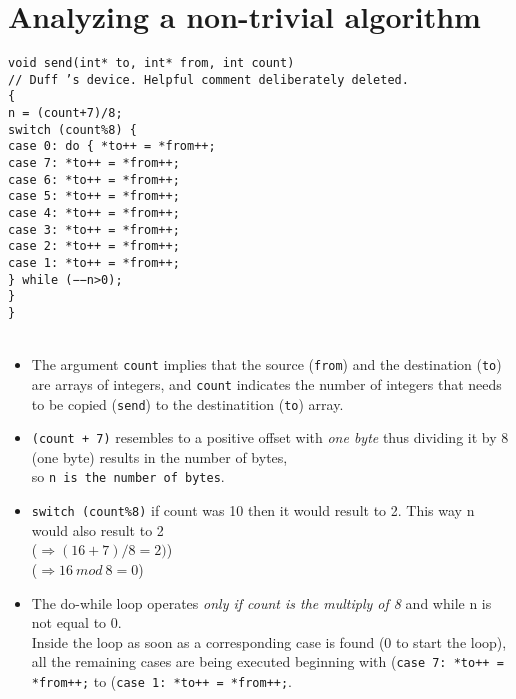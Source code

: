 \documentclass{article}
\begin{document}
 \section*{Analyzing a non-trivial algorithm}
 \texttt{void send(int* to, int* from, int count)\\
    // Duff ’s device. Helpful comment deliberately deleted.\\
    \{\\
      n = (count+7)/8;\\
      switch (count\%8) \{\\
      case 0: do \{ *to++ = *from++;\\
      case 7: *to++ = *from++;\\
      case 6: *to++ = *from++;\\
      case 5: *to++ = *from++;\\
      case 4: *to++ = *from++;\\
      case 3: *to++ = *from++;\\
      case 2: *to++ = *from++;\\
      case 1: *to++ = *from++;\\
        \} while (−−n>0);\\
      \}\\
    \}}
    \\
    \\
    \begin{itemize}
     \item The argument \texttt{count} implies that the source (\texttt{from}) and the destination (\texttt{to}) are arrays of integers,
     and \texttt{count} indicates the number of integers that needs to be copied (\texttt{send}) to the destinatition (\texttt{to}) array.
     \item \texttt{(count + 7)} resembles to a positive offset with \textsl{one byte} thus dividing it by $8$ (one byte) results in the number of bytes, \\
     so \texttt{n is the number of bytes}.
     \item \texttt{switch (count\%8)} if count was 10 then it would result to 2. This way n would also result to 2 \\
     ($\Rightarrow (16 + 7) / 8 = 2)$)\\
     ($\Rightarrow 16\ mod\ 8 = 0$)
     \item The do-while loop operates \textsl{only if count is the multiply of 8} and while n is not equal to 0. \\
     Inside the loop as soon as a corresponding case is found ($0$ to start the loop), all the remaining cases are being executed
     beginning with (\texttt{case 7: *to++ = *from++;} to (\texttt{case 1: *to++ = *from++;}.
    \end{itemize}
    
\end{document}
